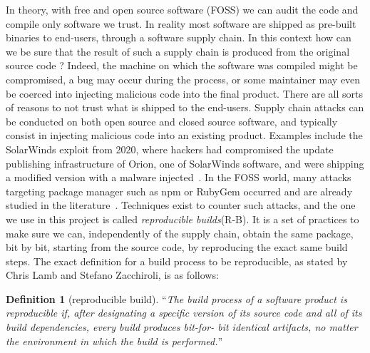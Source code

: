 \documentclass[a4paper,11pt,oneside]{report}
\theoremstyle{definition}
\newtheorem{definition}{Definition}[section]
\newcommand{\rb}{reproducible builds\xspace}
\begin{document}
In theory, with free and open source software (FOSS) we can audit the code and
compile only software we trust. In reality most software are shipped as
pre-built binaries to end-users, through a software supply chain. In this
context how can we be sure that the result of such a supply chain is produced
from the original source code ? Indeed, the machine on which the software was
compiled might be compromised, a bug may occur during the process, or some
maintainer may even be coerced into injecting malicious code into the final
product. There are all sorts of reasons to not trust what is shipped to the
end-users. Supply chain attacks can be conducted on both open source and closed
source software, and typically consist in injecting malicious code into an
existing product. Examples include the SolarWinds exploit from 2020, where
hackers had compromised the update publishing infrastructure of Orion, one of
SolarWinds software, and were shipping a modified version with a malware
injected~\cite{enwiki:solarwinds}. In the FOSS world, many attacks targeting
package manager such as npm or RubyGem occurred and are already studied in the
literature~\cite{10.1007/978-3-030-52683-2_2}.
Techniques exist to counter such attacks, and the one we use in this project is
called \emph{\rb}(R-B). It is a set of practices to make sure we can, independently of
the supply chain, obtain the same package, bit by bit, starting from the source
code, by reproducing the exact same build steps. The exact definition for a
build process to be reproducible, as stated by Chris Lamb and Stefano Zacchiroli, is
as follows:

\begin{definition}[reproducible build]
\label{def:reprobuild}
``\emph{The build process of a software
product is reproducible if, after designating a
specific version of its source code and all of its
build dependencies, every build produces bit-for-
bit identical artifacts, no matter the environment
in which the build is performed.}''~\cite{DBLP:journals/corr/abs-2104-06020}
\end{definition}
\end{document}
